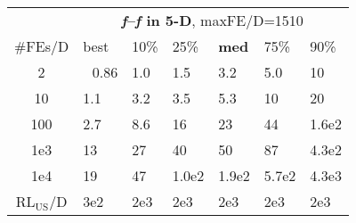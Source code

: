 \begin{tabular}{c|llllll}
 & \multicolumn{6}{|c}{\textbf{\textit{f}\raisebox{-0.35ex}{1}--\textit{f}\raisebox{-0.35ex}{24} in 5-D}, maxFE/D=1510}\\
\#FEs/D & best & 10\% & 25\% & \textbf{med} & 75\% & 90\%\\
2 & ~\,0.86 & \hspace*{1ex}1.0 & \hspace*{1ex}1.5 & \hspace*{1ex}3.2 & \hspace*{1ex}5.0 & 10\\
10 & \hspace*{1ex}1.1 & \hspace*{1ex}3.2 & \hspace*{1ex}3.5 & \hspace*{1ex}5.3 & 10 & 20\\
100 & \hspace*{1ex}2.7 & \hspace*{1ex}8.6 & 16 & 23 & 44 & 1.6e2\\
1e3 & 13 & 27 & 40 & 50 & 87 & 4.3e2\\
1e4 & 19 & 47 & 1.0e2 & 1.9e2 & 5.7e2 & 4.3e3\\
$\text{RL}_{\text{US}}$/D & 3e2 & 2e3 & 2e3 & 2e3 & 2e3 & 2e3
\end{tabular}
